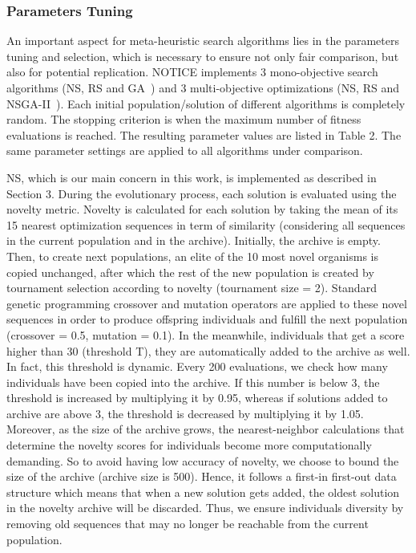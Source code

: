 \subsubsection{Parameters Tuning}
An important aspect for meta-heuristic search algorithms lies in the parameters tuning and selection, which is necessary to ensure not only fair comparison, but also for potential replication.
NOTICE implements 3 mono-objective search algorithms (NS, RS and GA~\cite{cooper2002adaptive}) and 3 multi-objective optimizations (NS, RS and NSGA-II~\cite{deb2002fast}). Each initial population/solution of different algorithms is completely random. The stopping criterion is when the maximum number of fitness evaluations is reached.
The resulting parameter values are listed in Table 2. The same parameter settings are applied to all algorithms under comparison.

NS, which is our main concern in this work, is implemented as described in Section 3. During the evolutionary process, each solution is evaluated using the novelty metric. Novelty is calculated for each solution by taking the mean of its 15 nearest optimization sequences in term of similarity (considering all sequences in the current population and in the archive). Initially, the archive is empty. 
Then, to create next populations, an elite of the 10 most novel organisms is copied unchanged, after which the rest of the new population is created by tournament selection according to novelty (tournament size = 2). Standard genetic programming crossover and mutation operators are applied to these novel sequences in order to produce offspring individuals and fulfill the next population (crossover = 0.5, mutation = 0.1).
In the meanwhile, individuals that get a score higher than 30 (threshold T), they are automatically added to the archive as well. 
In fact, this threshold is dynamic. Every 200 evaluations, we check how many individuals have been copied into the archive. If this number is below 3, the threshold is increased by multiplying it by 0.95, whereas if solutions added to archive are above 3, the threshold is decreased by multiplying it by 1.05. 
Moreover, as the size of the archive grows, the nearest-neighbor calculations that determine the novelty scores for individuals become more computationally demanding. So to avoid having low accuracy of novelty, we choose to bound the size of the archive (archive size is 500). Hence, it follows a first-in first-out data structure which means that when a new solution gets added, the oldest solution in the novelty archive will be discarded. Thus, we ensure individuals diversity by removing old sequences that may no longer be reachable from the current population.

